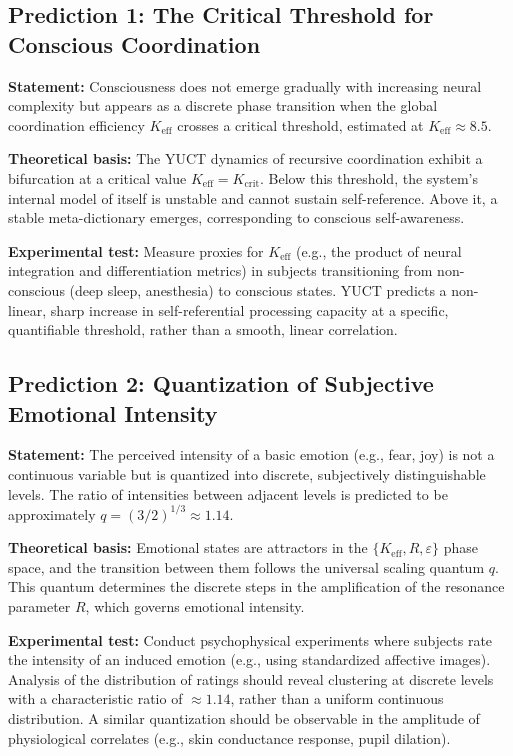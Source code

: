 \documentclass[12pt,a4paper]{article}
\begin{document}
	\subsection{Prediction 1: The Critical Threshold for Conscious Coordination}
	
	\textbf{Statement:} Consciousness does not emerge gradually with increasing neural complexity but appears as a discrete phase transition when the global coordination efficiency \(K_{\mathrm{eff}}\) crosses a critical threshold, estimated at \(K_{\mathrm{eff}} \approx 8.5\).
	
	\textbf{Theoretical basis:} The YUCT dynamics of recursive coordination exhibit a bifurcation at a critical value \(K_{\mathrm{eff}} = K_{\mathrm{crit}}\). Below this threshold, the system's internal model of itself is unstable and cannot sustain self-reference. Above it, a stable meta-dictionary emerges, corresponding to conscious self-awareness.
	
	\textbf{Experimental test:} Measure proxies for \(K_{\mathrm{eff}}\) (e.g., the product of neural integration and differentiation metrics) in subjects transitioning from non-conscious (deep sleep, anesthesia) to conscious states. YUCT predicts a non-linear, sharp increase in self-referential processing capacity at a specific, quantifiable threshold, rather than a smooth, linear correlation.
	
	\subsection{Prediction 2: Quantization of Subjective Emotional Intensity}
	
	\textbf{Statement:} The perceived intensity of a basic emotion (e.g., fear, joy) is not a continuous variable but is quantized into discrete, subjectively distinguishable levels. The ratio of intensities between adjacent levels is predicted to be approximately \(q = (3/2)^{1/3} \approx 1.14\).
	
	\textbf{Theoretical basis:} Emotional states are attractors in the \(\{K_{\mathrm{eff}}, R, \varepsilon\}\) phase space, and the transition between them follows the universal scaling quantum \(q\). This quantum determines the discrete steps in the amplification of the resonance parameter \(R\), which governs emotional intensity.
	
	\textbf{Experimental test:} Conduct psychophysical experiments where subjects rate the intensity of an induced emotion (e.g., using standardized affective images). Analysis of the distribution of ratings should reveal clustering at discrete levels with a characteristic ratio of \(\approx 1.14\), rather than a uniform continuous distribution. A similar quantization should be observable in the amplitude of physiological correlates (e.g., skin conductance response, pupil dilation).
	
\end{document}
